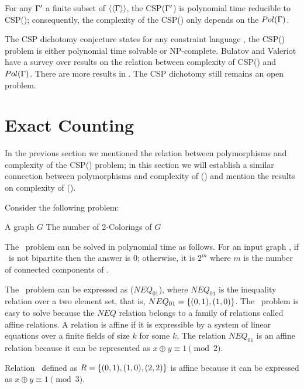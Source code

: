 \begin{cor}
For any \(\Gamma'\) a finite subset of \(\langle\langle \Gamma \rangle\rangle\),
the CSP(\(\Gamma'\)) is polynomial time reducible to  CSP(\mrelset);
consequently, the complexity of the CSP(\mrelset) only depends on the \(Pol(\Gamma)\)\@.
\end{cor}

The CSP dichotomy conjecture states for any constraint language \mrelset, 
the CSP(\mrelset) problem is either polynomial time solvable or NP-complete.
Bulatov and Valeriot \cite{recent08}
have a survey over results on the relation between complexity of CSP(\mrelset) and \(Pol(\Gamma)\).
There are more results in \cite{dur628, valeriote}\@.
The CSP dichotomy still remains an open problem. 

\section{Exact Counting}
In the previous section we mentioned the relation between polymorphisms and complexity of
the CSP(\mrelset) problem; in this section we will establish a similar connection 
between polymorphisms and complexity of \ccsp(\mrelset) and mention the
results on complexity of \ccsp(\mrelset)\@.

Consider the following problem:

\pdef{\cdcol}
{A graph \(G\)}
{The number of 2-Colorings of \(G\)}

The \cdcol\ problem can be solved in polynomial time as follows.
For an input graph \mG, if \mG\ is not bipartite then the answer is \(0\); otherwise,
it is \(2^m\) where \(m\) is the number of connected components of \mG\@.

The \cdcol\ problem can be expressed as \ccsp(\(NEQ_{01}\)), where
\(NEQ_{01}\) is the inequality relation over a two element set, that is,
\(NEQ_{01}=\{{(0,1),(1,0)}\}\)\@. 
The \cdcol\ problem is easy to solve because
the \(NEQ\) relation belongs to a family of relations called affine relations.
A relation is affine if it is expressible by a system of linear equations over a
finite fields  of size \(k\) for some \(k\)\@. The relation \(NEQ_{01}\) is an 
affine relation because it can be represented as \(x\oplus y \equiv 1 \pmod{2}\)\@.

\begin{example}
Relation \mR\ defined as \(R=\{{(0,1),(1,0),(2,2)}\}\) is affine because it can be expressed as 
\(x \oplus y \equiv 1 \pmod{3}\)\@.
\end{example}

